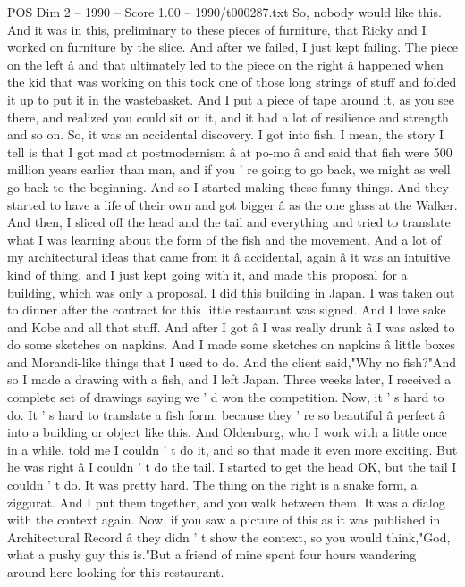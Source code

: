 \begin{textsample}{POS Dim 2 – 1990 – Score 1.00 – 1990/t000287.txt}
So, nobody would like this.
And it was in this, preliminary to these pieces of furniture, that Ricky and I worked on furniture by the slice.
And after we failed, I just kept failing.
The piece on the left â and that ultimately led to the piece on the right â happened when the kid that was working on this took one of those long strings of stuff and folded it up to put it in the wastebasket.
And I put a piece of tape around it, as you see there, and realized you could sit on it, and it had a lot of resilience and strength and so on.
So, it was an accidental discovery.
I got into fish.
I mean, the story I tell is that I got mad at postmodernism â at po-mo â and said that fish were 500 million years earlier than man, and if you ' re going to go back, we might as well go back to the beginning.
And so I started making these funny things.
And they started to have a life of their own and got bigger â as the one glass at the Walker.
And then, I sliced off the head and the tail and everything and tried to translate what I was learning about the form of the fish and the movement.
And a lot of my architectural ideas that came from it â accidental, again â it was an intuitive kind of thing, and I just kept going with it, and made this proposal for a building, which was only a proposal.
I did this building in Japan.
I was taken out to dinner after the contract for this little restaurant was signed.
And I love sake and Kobe and all that stuff.
And after I got â I was really drunk â I was asked to do some sketches on napkins.
And I made some sketches on napkins â little boxes and Morandi-like things that I used to do.
And the client said,"Why no fish?"And so I made a drawing with a fish, and I left Japan.
Three weeks later, I received a complete set of drawings saying we ' d won the competition.
Now, it ' s hard to do.
It ' s hard to translate a fish form, because they ' re so beautiful â perfect â into a building or object like this.
And Oldenburg, who I work with a little once in a while, told me I couldn ' t do it, and so that made it even more exciting.
But he was right â I couldn ' t do the tail.
I started to get the head OK, but the tail I couldn ' t do.
It was pretty hard.
The thing on the right is a snake form, a ziggurat.
And I put them together, and you walk between them.
It was a dialog with the context again.
Now, if you saw a picture of this as it was published in Architectural Record â they didn ' t show the context, so you would think,"God, what a pushy guy this is."But a friend of mine spent four hours wandering around here looking for this restaurant.

\end{textsample}

